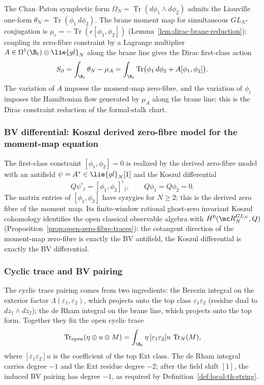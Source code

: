 \documentclass[11pt]{memoir}
\begin{document}
The Chan--Paton symplectic form
\(\Omega_N=\operatorname{Tr}(d\phi_1\wedge d\phi_2)\) admits the
Liouville one-form
\(\theta_N=\operatorname{Tr}(\phi_1\,d\phi_2)\). The brane moment map
for simultaneous \(GL_N\)-conjugation is
\(\mu_\epsilon=-\operatorname{Tr}(\epsilon[\phi_1,\phi_2])\)
(Lemma~\ref{lem:dirac-brane-reduction}); coupling its zero-fibre
constraint by a Lagrange multiplier
\(A\in\Omega^1(\R_t)\otimes\lie{gl}_N\) along the brane line gives
the Dirac first-class action
\begin{equation}\label{eq:open-action-derived-23}
  S_\partial=
    \int_{\R_t}\theta_N-\mu_A=
    \int_{\R_t}\operatorname{Tr}\bigl(\phi_1\,d\phi_2
      +A[\phi_1,\phi_2]\bigr).
\end{equation}
The variation of \(A\) imposes the moment-map zero-fibre, and the
variation of \(\phi_i\) imposes the Hamiltonian flow generated by
\(\mu_A\) along the brane line; this is the Dirac constraint
reduction of the formal-stalk chart.

\subsubsection*{BV differential: Koszul derived zero-fibre model for the moment-map equation}

The first-class constraint \([\phi_1,\phi_2]=0\) is realized by the
derived zero-fibre model with an antifield
\(\psi=A^\ast\in\lie{gl}_N[1]\) and the Koszul differential
\begin{equation}\label{eq:open-Q-derived-23}
  Q\psi^i{}_j=[\phi_1,\phi_2]^i{}_j,\qquad
  Q\phi_1=Q\phi_2=0.
\end{equation}
The matrix entries of \([\phi_1,\phi_2]\) have syzygies for
\(N\geq2\); this is the derived zero fibre of the moment map.  Its
finite-window rational ghost-zero invariant Koszul cohomology identifies
the open classical observable algebra with
\(H^0(\mc R_N^{GL_N},Q)\)
(Proposition~\ref{prop:open-zero-fibre-traces}): the cotangent
direction of the moment-map zero-fibre is exactly the BV antifield,
the Koszul differential is exactly the BV differential.

\subsubsection*{Cyclic trace and BV pairing}

The cyclic trace pairing comes from two ingredients: the Berezin
integral on the exterior factor
\(\Lambda(\varepsilon_1,\varepsilon_2)\), which projects onto the
top class \(\varepsilon_1\varepsilon_2\) (residue dual to
\(dz_1\wedge dz_2\)); the de Rham integral on the brane line, which
projects onto the top form. Together they fix the open cyclic trace
\[
  \operatorname{Tr}_{\mathrm{open}}(\eta\otimes u\otimes M)
    =\int_{\R_t}\eta\,
      [\varepsilon_1\varepsilon_2]u\,
      \operatorname{Tr}_N(M),
\]
where \([\varepsilon_1\varepsilon_2]u\) is the coefficient of the top
Ext class. The de Rham integral carries degree \(-1\) and the Ext
residue degree \(-2\); after the field shift \([1]\), the induced BV
pairing has degree \(-1\), as required by
Definition~\ref{def:local-th-string}.
\end{document}
